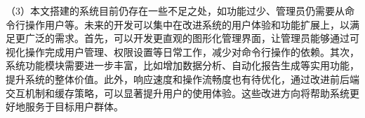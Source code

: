 \begin{conclusion}
（3）本文搭建的系统目前仍存在一些不足之处，如功能过少、管理员仍需要从命令行操作用户等。未来的开发可以集中在改进系统的用户体验和功能扩展上，以满足更广泛的需求。首先，可以开发更直观的图形化管理界面，让管理员能够通过可视化操作完成用户管理、权限设置等日常工作，减少对命令行操作的依赖。其次，系统功能模块需要进一步丰富，比如增加数据分析、自动化报告生成等实用功能，提升系统的整体价值。此外，响应速度和操作流畅度也有待优化，通过改进前后端交互机制和缓存策略，可以显著提升用户的使用体验。这些改进方向将帮助系统更好地服务于目标用户群体。

\end{conclusion}

